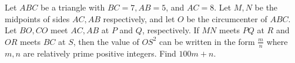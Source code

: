 Let $ABC$ be a triangle with $BC=7,AB=5$, and $AC=8$. Let $M,N$ be the midpoints of sides $AC,AB$ respectively, and let $O$ be the circumcenter of $ABC$. Let $BO, CO$ meet $AC, AB$ at $P$ and $Q$, respectively. If $MN$ meets $PQ$ at $R$ and $OR$ meets $BC$ at $S$, then the value of $OS^2$ can be written in the form $\frac{m}{n}$ where $m,n$ are relatively prime positive integers. Find $100m+n$.
